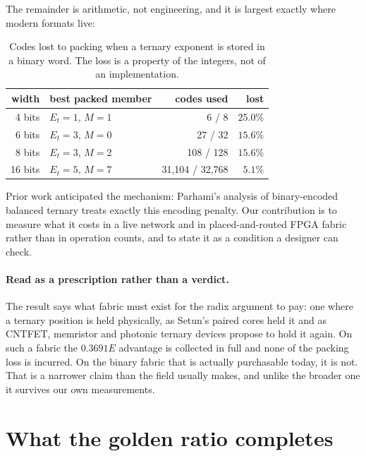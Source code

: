 The remainder is arithmetic, not engineering, and it is largest exactly where
modern formats live:

\begin{table}[t]\centering
\caption{Codes lost to packing when a ternary exponent is stored in a binary
word. The loss is a property of the integers, not of an implementation.}
\label{tab:packloss}
\begin{tabular}{rlrr}
\toprule
width & best packed member & codes used & lost \\
\midrule
4 bits & $E_t{=}1$, $M{=}1$ & 6 / 8 & $25.0\%$ \\
6 bits & $E_t{=}3$, $M{=}0$ & 27 / 32 & $15.6\%$ \\
8 bits & $E_t{=}3$, $M{=}2$ & 108 / 128 & $15.6\%$ \\
16 bits & $E_t{=}5$, $M{=}7$ & 31{,}104 / 32{,}768 & $5.1\%$ \\
\bottomrule
\end{tabular}
\end{table}

Prior work anticipated the mechanism: Parhami's analysis of binary-encoded
balanced ternary treats exactly this encoding penalty. Our contribution is to
measure what it costs in a live network and in placed-and-routed FPGA fabric rather
than in operation counts, and to state it as a condition a designer can check.

\paragraph{Read as a prescription rather than a verdict.} The result says what
fabric must exist for the radix argument to pay: one where a ternary position is
held physically, as Setun's paired cores held it and as CNTFET, memristor and
photonic ternary devices propose to hold it again. On such a fabric the
$0.3691E$ advantage is collected in full and none of the packing loss is
incurred. On the binary fabric that is actually purchasable today, it is not.
That is a narrower claim than the field usually makes, and unlike the broader one
it survives our own measurements.




\section{What the golden ratio completes}

